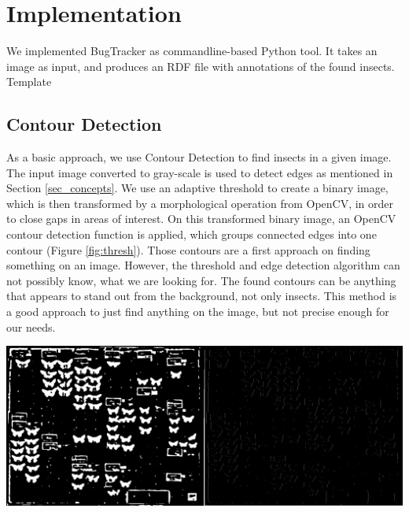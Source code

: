 \section{Implementation}
\label{sec_implementation}

We implemented BugTracker as commandline-based Python tool.
It takes an image as input, and produces an RDF file with annotations of the found insects.
Template

\subsection{Contour Detection}
As a basic approach, we use Contour Detection to find insects in a given image.
The input image converted to gray-scale is used to detect edges as mentioned in Section \ref{sec_concepts}.
We use an adaptive threshold to create a binary image, which is then transformed by a morphological operation from OpenCV, in order to close gaps in areas of interest.
On this transformed binary image, an OpenCV contour detection function is applied, which groups connected edges into one contour (Figure \ref{fig:thresh}).
Those contours are a first approach on finding something on an image.
However, the threshold and edge detection algorithm can not possibly know, what we are looking for.
The found contours can be anything that appears to stand out from the background, not only insects.
This method is a good approach to just find anything on the image, but not precise enough for our needs.
\begin{center}
	\includegraphics[width=1.0\textwidth]{images/chap5_thresh.png}
	\label{fig:thresh}
\end{center}


